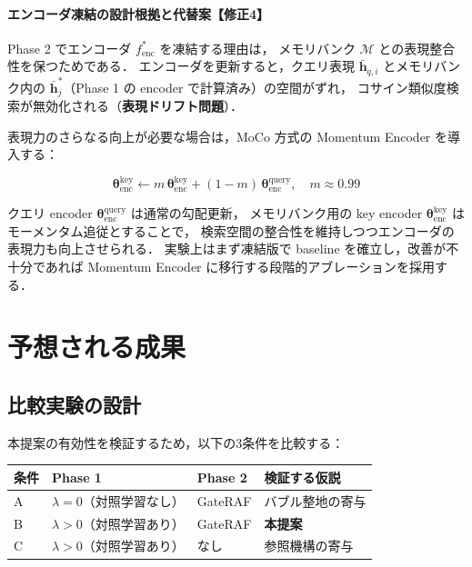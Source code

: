 \documentclass[12pt, a4paper]{ltjsarticle}
\begin{document}
\paragraph{エンコーダ凍結の設計根拠と代替案【修正4】}
Phase 2 でエンコーダ $f_{\text{enc}}^*$ を凍結する理由は，
メモリバンク $\mathcal{M}$ との表現整合性を保つためである．
エンコーダを更新すると，クエリ表現 $\bar{\bm{h}}_{q,i}$ とメモリバンク内の
$\bar{\bm{h}}_j^*$（Phase 1 の encoder で計算済み）の空間がずれ，
コサイン類似度検索が無効化される（\textbf{表現ドリフト問題}）．

\noindent
表現力のさらなる向上が必要な場合は，MoCo 方式の Momentum Encoder を導入する：

\begin{equation}
  \bm{\theta}_{\text{enc}}^{\text{key}}
  \leftarrow m\,\bm{\theta}_{\text{enc}}^{\text{key}}
           + (1-m)\,\bm{\theta}_{\text{enc}}^{\text{query}},
  \quad m \approx 0.99
  \label{eq:momentum}
\end{equation}

\noindent
クエリ encoder $\bm{\theta}_{\text{enc}}^{\text{query}}$ は通常の勾配更新，
メモリバンク用の key encoder $\bm{\theta}_{\text{enc}}^{\text{key}}$ はモーメンタム追従とすることで，
検索空間の整合性を維持しつつエンコーダの表現力も向上させられる．
実験上はまず凍結版で baseline を確立し，改善が不十分であれば Momentum Encoder に移行する段階的アブレーションを採用する．

\section{予想される成果}

\subsection{比較実験の設計}

本提案の有効性を検証するため，以下の3条件を比較する：

\begin{table}[h]
\centering
\begin{tabular}{llll}
  \toprule
  条件 & Phase 1 & Phase 2 & 検証する仮説 \\
  \midrule
  A & $\lambda = 0$（対照学習なし） & GateRAF & バブル整地の寄与 \\
  B & $\lambda > 0$（対照学習あり）& GateRAF & \textbf{本提案} \\
  C & $\lambda > 0$（対照学習あり）& なし    & 参照機構の寄与 \\
  \bottomrule
\end{tabular}
\end{table}
\end{document}
